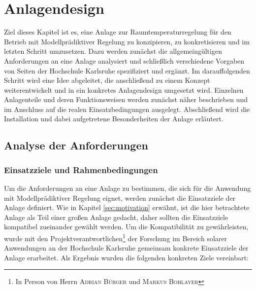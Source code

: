 %
%

\renewcommand{\chapterheadstartvskip}{\vspace*{2cm}}

\chapter{Anlagendesign}
\label{chap:anlagendesign}

\renewcommand{\chapterheadstartvskip}{\vspace*{-0.5cm}}

Ziel dieses Kapitel ist es, eine Anlage zur Raumtemperaturregelung für den Betrieb mit Modellprädiktiver Regelung zu konzipieren, zu konkretisieren und im letzten Schritt umzusetzen. Dazu werden zunächst die allgemeingültigen Anforderungen an eine Anlage analysiert und schließlich verschiedene Vorgaben von Seiten der Hochschule Karlsruhe spezifiziert und ergänzt. Im darauffolgenden Schritt wird eine Idee abgeleitet, die anschließend zu einem Konzept weiterentwickelt und in ein konkretes Anlagendesign umgesetzt wird. Einzelnen Anlagenteile und deren Funktionsweisen werden zunächst näher beschrieben und im Anschluss auf die realen Einsatzbedingungen ausgelegt. Abschließend wird die Installation und dabei aufgetretene Besonderheiten der Anlage erläutert.

\section{Analyse der Anforderungen}
\label{sec:anforderungen}

\subsection{Einsatzziele und Rahmenbedingungen}
Um die Anforderungen an eine Anlage zu bestimmen, die sich für die Anwendung mit Modellprädiktiver Regelung eignet, werden zunächst die Einsatzziele der Anlage definiert. Wie in Kapitel \ref{sec:motivation} erwähnt, ist die hier betrachtete Anlage als Teil einer großen Anlage gedacht, daher sollten die Einsatzziele kompatibel zueinander gewählt werden. Um die Kompatibilität zu gewährleisten, wurde mit den Projektverantwortlichen\footnote{In Person von Herrn \textsc{Adrian Bürger} und \textsc{Markus Bohlayer}} der Forschung im Bereich solarer Anwendungen an der Hochschule Karlsruhe gemeinsam konkrete Einsatzziele der Anlage erarbeitet. Als Ergebnis wurden die folgenden konkreten Ziele vereinbart:
 
